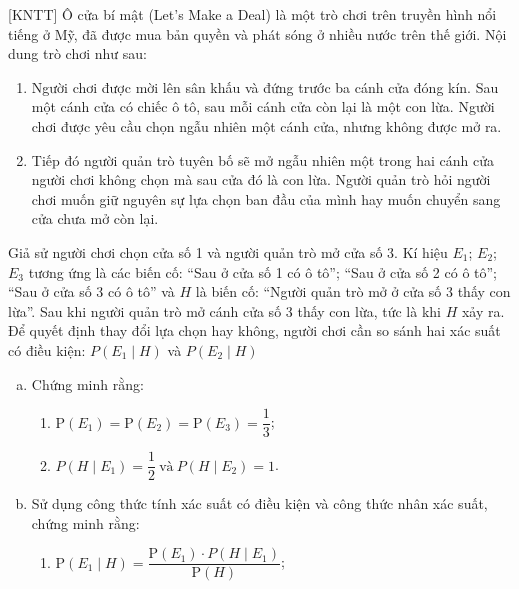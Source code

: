 \begin{bt}%
[KNTT]%
	Ô cửa bí mật (Let's Make a Deal) là một trò chơi trên truyền hình nổi tiếng ở Mỹ, đã được mua bản quyền và phát sóng ở nhiều nước trên thế giới. Nội dung trò chơi như sau:
	\begin{enumerate}[$\bullet$]
		\item Người chơi được mời lên sân khấu và đứng trước ba cánh cửa đóng kín. Sau một cánh cửa có chiếc ô tô, sau mỗi cánh cửa còn lại là một con lừa. Người chơi được yêu cầu chọn ngẫu nhiên một cánh cửa, nhưng không được mở ra.
		\item Tiếp đó người quản trò tuyên bố sẽ mở ngẫu nhiên một trong hai cánh cửa người chơi không chọn mà sau cửa đó là con lừa. Người quản trò hỏi người chơi muốn giữ nguyên sự lựa chọn ban đầu của mình hay muốn chuyển sang cửa chưa mở còn lại.
	\end{enumerate}
	Giả sử người chơi chọn cửa số 1 và người quản trò mở cửa số 3. Kí hiệu $E_1$; $E_2$; $E_3$ tương ứng là các biến cố: ``Sau ở cửa số 1 có ô tô''; ``Sau ở cửa số 2 có ô tô''; ``Sau ở cửa số 3 có ô tô'' và $H$ là biến cố: ``Người quản trò mở ở cửa số 3 thấy con lừa''.
	Sau khi người quản trò mở cánh cửa số 3 thấy con lừa, tức là khi $H$ xảy ra. Để quyết định thay đổi lựa chọn hay không, người chơi cần so sánh hai xác suất có điều kiện: $P\left(E_1\mid H\right)$ và $P\left(E_2\mid H\right)$
	\begin{enumerate}[a)]
		\item Chứng minh rằng:
		\begin{enumerate}[$\bullet$]
			\item $\mathrm{P}(E_1)=\mathrm{P}(E_2)=\mathrm{P}(E_3)=\dfrac{1}{3}$;
			\item $P\left(H \mid E_1\right)=\dfrac{1}{2} ~\text{và}~P\left(H \mid E_2\right)=1$.
		\end{enumerate}
		\item Sử dụng công thức tính xác suất có điều kiện và công thức nhân xác suất, chứng minh rằng:
		\begin{enumerate}[$\bullet$]
			\item $ \mathrm{P}\left(E_1 \mid H\right)=\dfrac{\mathrm{P}(E_1) \cdot P\left(H \mid E_1\right)}{\mathrm{P}(H)}$;
			\end{enumerate}

\end{enumerate}
\end{bt}
